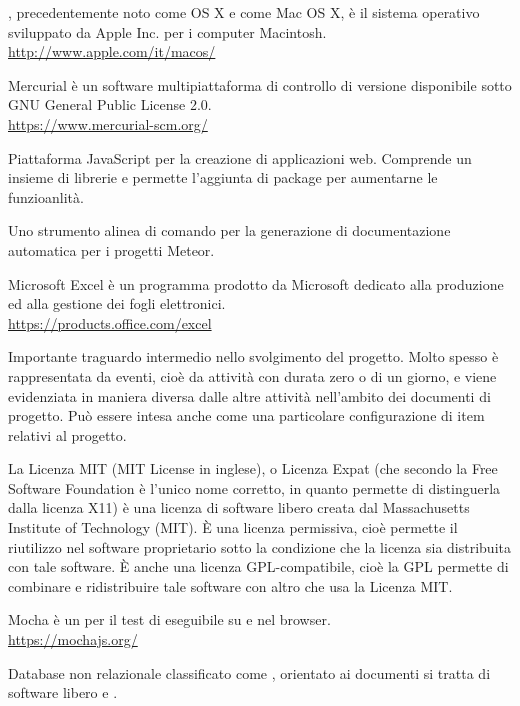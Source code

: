 \Macos, precedentemente noto come OS X e come Mac OS X, è il sistema operativo sviluppato da Apple Inc. per i computer Macintosh.\\
\url{http://www.apple.com/it/macos/}

Mercurial è un software multipiattaforma di controllo di versione disponibile sotto GNU General Public License 2.0.\\
\url{https://www.mercurial-scm.org/}

Piattaforma JavaScript per la creazione di applicazioni web. Comprende un insieme di librerie e permette l'aggiunta di package per aumentarne le funzioanlità.

Uno strumento alinea di comando per la generazione di documentazione automatica per i progetti Meteor.

Microsoft Excel è un programma prodotto da Microsoft dedicato alla produzione ed alla gestione dei fogli elettronici.\\
\url{https://products.office.com/excel}

Importante traguardo intermedio nello svolgimento del progetto. Molto spesso è rappresentata da eventi, cioè da attività con durata zero o di un giorno, e viene evidenziata in maniera diversa dalle altre attività nell'ambito dei documenti di progetto. Può essere intesa anche come una particolare configurazione di item relativi al progetto.

La Licenza MIT (MIT License in inglese), o Licenza Expat (che secondo la Free Software Foundation è l'unico nome corretto, in quanto permette di distinguerla dalla licenza X11) è una licenza di software libero creata dal Massachusetts Institute of Technology (MIT). \`{E} una licenza permissiva, cioè permette il riutilizzo nel software proprietario sotto la condizione che la licenza sia distribuita con tale software. \`{E} anche una licenza GPL-compatibile, cioè la GPL permette di combinare e ridistribuire tale software con altro che usa la Licenza MIT.

Mocha è un  per il test di  eseguibile su  e nel browser.\\
\url{https://mochajs.org/}

Database non relazionale classificato come , orientato ai documenti si tratta di software libero e .
\clearpage
